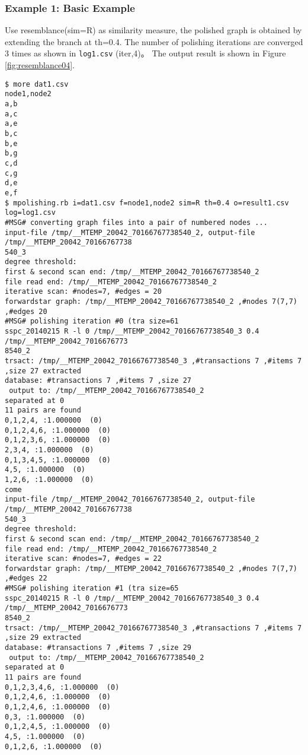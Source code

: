 \subsubsection*{Example 1: Basic Example}

Use resemblance(sim=R) as similarity measure, the polished graph is obtained by extending the branch at th=0.4.
The number of polishing iterations are converged 3 times as shown in \verb|log1.csv| (iter,4)。
The output result is shown in Figure \ref{fig:resemblance04}.


\begin{Verbatim}[baselinestretch=0.7,frame=single]
$ more dat1.csv
node1,node2
a,b
a,c
a,e
b,c
b,e
b,g
c,d
c,g
d,e
e,f
$ mpolishing.rb i=dat1.csv f=node1,node2 sim=R th=0.4 o=result1.csv log=log1.csv
#MSG# converting graph files into a pair of numbered nodes ...
input-file /tmp/__MTEMP_20042_70166767738540_2, output-file /tmp/__MTEMP_20042_70166767738
540_3
degree threshold: 
first & second scan end: /tmp/__MTEMP_20042_70166767738540_2
file read end: /tmp/__MTEMP_20042_70166767738540_2
iterative scan: #nodes=7, #edges = 20
forwardstar graph: /tmp/__MTEMP_20042_70166767738540_2 ,#nodes 7(7,7) ,#edges 20
#MSG# polishing iteration #0 (tra size=61
sspc_20140215 R -l 0 /tmp/__MTEMP_20042_70166767738540_3 0.4 /tmp/__MTEMP_20042_7016676773
8540_2
trsact: /tmp/__MTEMP_20042_70166767738540_3 ,#transactions 7 ,#items 7 ,size 27 extracted 
database: #transactions 7 ,#items 7 ,size 27
 output to: /tmp/__MTEMP_20042_70166767738540_2
separated at 0
11 pairs are found
0,1,2,4, :1.000000  (0)
0,1,2,4,6, :1.000000  (0)
0,1,2,3,6, :1.000000  (0)
2,3,4, :1.000000  (0)
0,1,3,4,5, :1.000000  (0)
4,5, :1.000000  (0)
1,2,6, :1.000000  (0)
come
input-file /tmp/__MTEMP_20042_70166767738540_2, output-file /tmp/__MTEMP_20042_70166767738
540_3
degree threshold: 
first & second scan end: /tmp/__MTEMP_20042_70166767738540_2
file read end: /tmp/__MTEMP_20042_70166767738540_2
iterative scan: #nodes=7, #edges = 22
forwardstar graph: /tmp/__MTEMP_20042_70166767738540_2 ,#nodes 7(7,7) ,#edges 22
#MSG# polishing iteration #1 (tra size=65
sspc_20140215 R -l 0 /tmp/__MTEMP_20042_70166767738540_3 0.4 /tmp/__MTEMP_20042_7016676773
8540_2
trsact: /tmp/__MTEMP_20042_70166767738540_3 ,#transactions 7 ,#items 7 ,size 29 extracted 
database: #transactions 7 ,#items 7 ,size 29
 output to: /tmp/__MTEMP_20042_70166767738540_2
separated at 0
11 pairs are found
0,1,2,3,4,6, :1.000000  (0)
0,1,2,4,6, :1.000000  (0)
0,1,2,4,6, :1.000000  (0)
0,3, :1.000000  (0)
0,1,2,4,5, :1.000000  (0)
4,5, :1.000000  (0)
0,1,2,6, :1.000000  (0)

\end{Verbatim}
